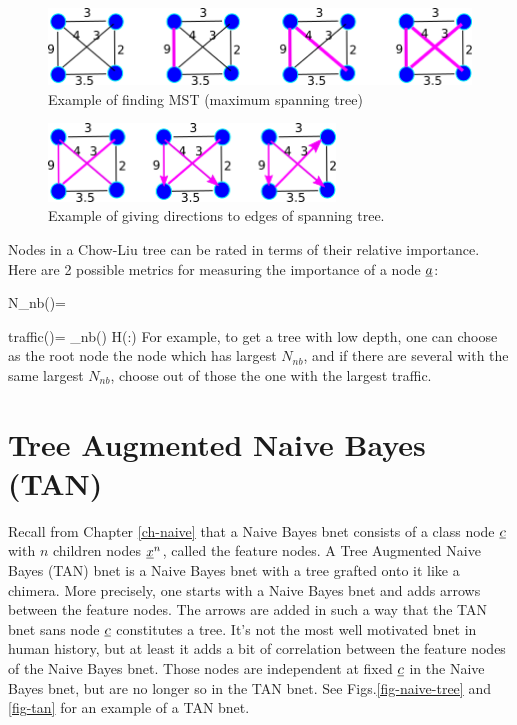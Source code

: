 \begin{figure}[h!]
\centering
\includegraphics[width=5in]
{chow/spanning-tree.png}
\caption{
Example of finding MST (maximum spanning tree)} 
\label{fig-spanning-tree}
\end{figure}

\begin{figure}[h!]
\centering
\includegraphics[width=3in]
{chow/tree-dir.png}
\caption{Example of giving directions
to edges of spanning tree.} 
\label{fig-tree-dir}
\end{figure}

Nodes in a Chow-Liu tree can
be rated in
terms
of their relative importance.
Here are 2 possible
metrics
for measuring 
the importance
of a node ${\underline{a}}$:

\beq
N_{nb}(\rva)=
\eeq

\beq
{\rm traffic}(\rva)=
\sum_{\rvn\in nb(\rva)}
H(\rva:\rvn)
\eeq
For example,
to get a tree with low depth, 
one can choose
as the root node
the node which has 
largest $N_{nb}$, and
if there are several
with the same largest $N_{nb}$,
choose out of those the 
one with the largest traffic.


\section*{Tree Augmented Naive Bayes (TAN)}

Recall from Chapter \ref{ch-naive}
that a Naive
Bayes bnet
consists
of  a class node ${\underline{c}}$
with
$n$ children nodes
${\underline{x}}^n$, called the feature nodes. A
Tree Augmented Naive Bayes (TAN) bnet
is a Naive Bayes bnet with 
a 
tree grafted onto it like a chimera.
More precisely,
one starts
with a Naive Bayes bnet 
and adds arrows between
the feature nodes.
The arrows are added in such a way
that the TAN bnet sans node ${\underline{c}}$
constitutes a tree.
It's not the most well 
motivated bnet in human
history,
but at least
it adds a bit
of correlation between
the feature nodes
of the Naive Bayes bnet.
Those nodes are independent
at fixed ${\underline{c}}$
in the Naive Bayes
bnet, but are no longer so
in the TAN bnet.
See Figs.\ref{fig-naive-tree}
and \ref{fig-tan}
for an example of a TAN bnet.



